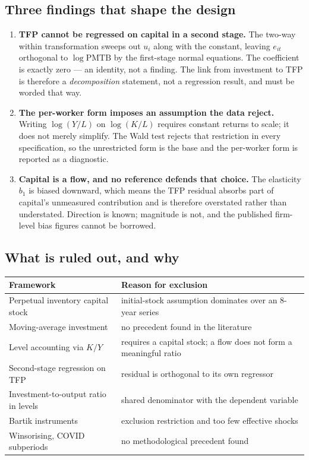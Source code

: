 \documentclass[11pt,a4paper]{article}
\begin{document}
\subsection*{Three findings that shape the design}

\begin{enumerate}[leftmargin=1.4em,itemsep=0.5em]

\item \textbf{TFP cannot be regressed on capital in a second stage.}
The two-way within transformation sweeps out $u_i$ along with the constant, leaving $e_{it}$
orthogonal to $\log \mathrm{PMTB}$ by the first-stage normal equations. The coefficient is
exactly zero --- an identity, not a finding. The link from investment to TFP is therefore a
\emph{decomposition} statement, not a regression result, and must be worded that way.

\item \textbf{The per-worker form imposes an assumption the data reject.}
Writing $\log(Y/L)$ on $\log(K/L)$ requires constant returns to scale; it does not merely
simplify. The Wald test rejects that restriction in every specification, so the unrestricted
form is the base and the per-worker form is reported as a diagnostic.

\item \textbf{Capital is a flow, and no reference defends that choice.}
The elasticity $b_1$ is biased downward, which means the TFP residual absorbs part of capital's
unmeasured contribution and is therefore overstated rather than understated. Direction is known;
magnitude is not, and the published firm-level bias figures cannot be borrowed.

\end{enumerate}

\subsection*{What is ruled out, and why}

\begin{center}
\small
\begin{tabular}{@{}p{5.6cm}p{9.4cm}@{}}
\toprule
\textbf{Framework} & \textbf{Reason for exclusion} \\
\midrule
Perpetual inventory capital stock & initial-stock assumption dominates over an 8-year series \\
Moving-average investment & no precedent found in the literature \\
Level accounting via $K/Y$ & requires a capital stock; a flow does not form a meaningful ratio \\
Second-stage regression on TFP & residual is orthogonal to its own regressor \\
Investment-to-output ratio in levels & shared denominator with the dependent variable \\
Bartik instruments & exclusion restriction and too few effective shocks \\
Winsorising, COVID subperiods & no methodological precedent found \\
\bottomrule
\end{tabular}
\end{center}
\end{document}
